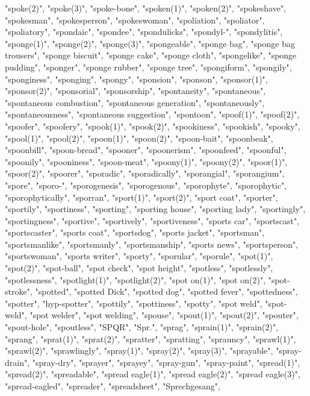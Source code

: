 "spoke(2)",
"spoke(3)",
"spoke-bone",
"spoken(1)",
"spoken(2)",
"spokeshave",
"spokesman",
"spokesperson",
"spokeswoman",
"spoliation",
"spoliator",
"spoliatory",
"spondaic",
"spondee",
"spondulicks",
"spondyl-",
"spondylitis",
"sponge(1)",
"sponge(2)",
"sponge(3)",
"spongeable",
"sponge bag",
"sponge bag trousers",
"sponge biscuit",
"sponge cake",
"sponge cloth",
"spongelike",
"sponge pudding",
"sponger",
"sponge rubber",
"sponge tree",
"spongiform",
"spongily",
"sponginess",
"sponging",
"spongy",
"sponsion",
"sponson",
"sponsor(1)",
"sponsor(2)",
"sponsorial",
"sponsorship",
"spontaneity",
"spontaneous",
"spontaneous combustion",
"spontaneous generation",
"spontaneously",
"spontaneousness",
"spontaneous suggestion",
"spontoon",
"spoof(1)",
"spoof(2)",
"spoofer",
"spoofery",
"spook(1)",
"spook(2)",
"spookiness",
"spookish",
"spooky",
"spool(1)",
"spool(2)",
"spoon(1)",
"spoon(2)",
"spoon-bait",
"spoonbeak",
"spoonbill",
"spoon-bread",
"spooner",
"spoonerism",
"spoonfeed",
"spoonful",
"spoonily",
"spooniness",
"spoon-meat",
"spoony(1)",
"spoony(2)",
"spoor(1)",
"spoor(2)",
"spoorer",
"sporadic",
"sporadically",
"sporangial",
"sporangium",
"spore",
"sporo-",
"sporogenesis",
"sporogenous",
"sporophyte",
"sporophytic",
"sporophytically",
"sporran",
"sport(1)",
"sport(2)",
"sport coat",
"sporter",
"sportily",
"sportiness",
"sporting",
"sporting house",
"sporting lady",
"sportingly",
"sportingness",
"sportive",
"sportively",
"sportiveness",
"sports car",
"sportscast",
"sportscaster",
"sports coat",
"sportsdog",
"sports jacket",
"sportsman",
"sportsmanlike",
"sportsmanly",
"sportsmanship",
"sports news",
"sportsperson",
"sportswoman",
"sports writer",
"sporty",
"sporular",
"sporule",
"spot(1)",
"spot(2)",
"spot-ball",
"spot check",
"spot height",
"spotless",
"spotlessly",
"spotlessness",
"spotlight(1)",
"spotlight(2)",
"spot on(1)",
"spot on(2)",
"spot-stroke",
"spotted",
"spotted Dick",
"spotted dog",
"spotted fever",
"spottedness",
"spotter",
"hyp-spotter",
"spottily",
"spottiness",
"spotty",
"spot weld",
"spot-weld",
"spot welder",
"spot welding",
"spouse",
"spout(1)",
"spout(2)",
"spouter",
"spout-hole",
"spoutless",
"SPQR",
"Spr.",
"sprag",
"sprain(1)",
"sprain(2)",
"sprang",
"sprat(1)",
"sprat(2)",
"spratter",
"spratting",
"sprauncy",
"sprawl(1)",
"sprawl(2)",
"sprawlingly",
"spray(1)",
"spray(2)",
"spray(3)",
"sprayable",
"spray-drain",
"spray-dry",
"sprayer",
"sprayey",
"spray-gun",
"spray-paint",
"spread(1)",
"spread(2)",
"spreadable",
"spread eagle(1)",
"spread eagle(2)",
"spread eagle(3)",
"spread-eagled",
"spreader",
"spreadsheet",
"Sprechgesang",
